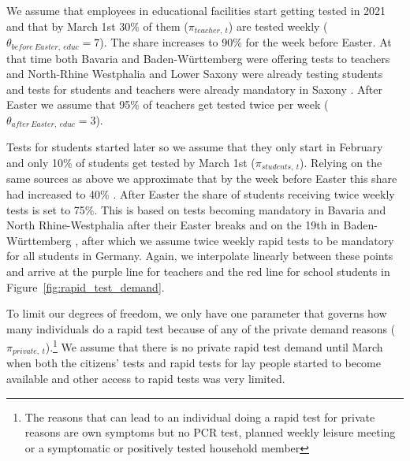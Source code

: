 
We assume that employees in educational facilities start getting tested in 2021 and that
by March 1st 30\% of them ($\pi_{teacher,\:t}$) are tested weekly
($\theta_{before\:Easter,\:educ} = 7$). The share increases to 90\% for the week before
Easter. At that time both Bavaria \citep{STMGP2021} and Baden-Württemberg
\citep{MinisteriumKultus2021} were offering tests to teachers and North-Rhine Westphalia
\citep{SchulministeriumNRW2021} and Lower Saxony \citep{NSMK2021} were already testing
students and tests for students and teachers were already mandatory in Saxony
\citep{SMK2021}. After Easter we assume that 95\% of teachers get tested twice per week
($\theta_{after\:Easter,\:educ} = 3$).

Tests for students started later \citep{MinisteriumKultus2021, SchulministeriumNRW2021}
so we assume that they only start in February and only 10\% of students get tested by
March 1st ($\pi_{students,\:t}$). Relying on the same sources as above we approximate
that by the week before Easter this share had increased to 40\%
\citep{SchulministeriumNRW2021}. After Easter the share of students receiving twice
weekly tests is set to 75\%. This is based on tests becoming mandatory in Bavaria
\citep{BayerischeStaatskanzlei2021} and North Rhine-Westphalia
\citep{SchulministeriumNRW2021b} after their Easter breaks and on the 19th in
Baden-Württemberg \citep{KMBaWue2021}, after which we assume twice weekly rapid tests to
be mandatory for all students in Germany. Again, we interpolate linearly between these
points and arrive at the purple line for teachers and the red line for school students in
Figure~\ref{fig:rapid_test_demand}.


To limit our degrees of freedom, we only have one parameter that governs how many
individuals do a rapid test because of any of the private demand reasons
($\pi_{private,\:t}$).\footnote{The reasons that can lead to an individual doing a rapid
test for private reasons are own symptoms but no PCR test, planned weekly leisure meeting
or a symptomatic or positively tested household member}
We assume that there is no private rapid test demand until March when both the citizens'
tests and rapid tests for lay people started to become available
\citep{Bundesanzeiger2021a, Bundesregierung2021} and other access to rapid tests was very
limited.


